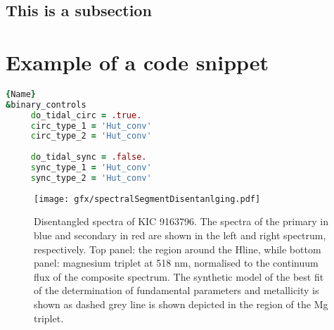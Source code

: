 \lipsum[4]

\subsection{This is a subsection}
\lipsum[4]

\section{Example of a code snippet \label{sec:MESA:Inlists}}
\lipsum[1]


\begin{table}[tp]
\begin{lstlisting}[language=Fortran,frame=Tb,
caption= Example for setting the tidal mechanisms in the \textit{star\_star} inlist. 
\label{code:tidalSettings}]{Name}
&binary_controls
	 do_tidal_circ = .true.
	 circ_type_1 = 'Hut_conv'
	 circ_type_2 = 'Hut_conv'
	 
	 do_tidal_sync = .false.
	 sync_type_1 = 'Hut_conv'
	 sync_type_2 = 'Hut_conv'
\end{lstlisting}
\end{table}


\lipsum[2-3]


\begin{figure}[pt!]
  \texttt{[image: gfx/spectralSegmentDisentanlging.pdf]}
  \caption{Disentangled spectra of KIC 9163796. The spectra of the primary in blue and secondary in red are shown in the left and right spectrum,
respectively. Top panel: the region around the H\textbeta line, while bottom panel: magnesium triplet at 518 nm, normalised to the continuum flux of the
composite spectrum. The synthetic model of the best fit of the determination of fundamental parameters and metallicity is shown as dashed grey
line is shown depicted in the region of the Mg triplet. \citep[Graphic taken from][]{Beck2018}}
  \label{fig:multiPanelPlot}
\end{figure}

\lipsum[3]


